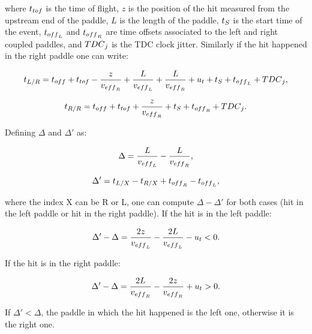 \documentclass{elsart}
\begin{document}
\noindent
where $t_{\rm{tof}}$ is the time of flight, $z$ is the position of the hit measured from the upstream end of the
paddle, $L$ is the length of the paddle, $t_{\rm{S}}$ is the start time of the event, $t_{\rm{off}_{\rm{L}}}$ and
$t_{\rm{off}_{\rm{R}}}$ are time offsets associated to the left and right coupled paddles, and ${\rm{TDC}}_{\rm{j}}$
is the TDC clock jitter. Similarly if the hit happened in the right paddle one can write:

\begin{equation}
  t_{{\rm{L}}/{\rm{R}}}=t_{\rm{off}}+t_{\rm{tof}}-\frac{z}{v_{\rm{eff}_{\rm{R}}}}+\frac{L}{v_{\rm{eff}_L}}
  +\frac{L}{v_{\rm{eff}_{\rm{R}}}}+u_{\rm{t}}+t_{\rm{S}}+t_{\rm{off}_{\rm{L}}}+{\rm{TDC}}_{\rm{j}},
\end{equation}

\begin{equation}
t_{R/R}=t_{\rm{off}}+t_{\rm{tof}}+\frac{z}{v_{\rm{eff}_{\rm{R}}}}+t_{\rm{S}}+t_{\rm{off}_{\rm{R}}}+{\rm{TDC}}_{\rm{j}}.
\end{equation}

Defining $\Delta$ and $\Delta'$ as:

\begin{equation}
\Delta=\frac{L}{v_{\rm{eff}_L}}-\frac{L}{v_{\rm{eff}_{\rm{R}}}},
\end{equation}

\begin{equation}
\Delta'=t_{\rm{L}/{\rm{X}}}-t_{\rm{R}/{\rm{X}}}+t_{\rm{off}_{\rm{R}}}-t_{\rm{off}_{\rm{L}}},
\end{equation}

\noindent
where the index X can be R or L, one can compute $\Delta-\Delta'$ for both cases (hit in the left paddle or hit
in the right paddle). If the hit is in the left paddle:

\begin{equation}
\Delta'-\Delta= \frac{2z}{v_{\rm{eff}_L}} - \frac{2L}{v_{\rm{eff}_L}} -u_{\rm{t}} <0.
\end{equation}

\noindent
If the hit is in the right paddle:

\begin{equation}
\Delta'-\Delta= \frac{2L}{v_{\rm{eff}_{\rm{R}}}}-\frac{2z}{v_{\rm{eff}_{\rm{R}}}} +u_{\rm{t}} >0.
\end{equation}

\noindent
If $\Delta'<\Delta$, the paddle in which the hit happened is the left one, otherwise it is the right one.
\end{document}
